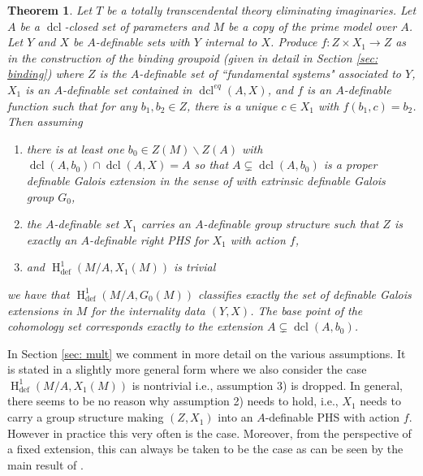 \documentclass{amsart}
\newtheorem{theorem}{Theorem}[section]
\theoremstyle{definition}
\theoremstyle{remark}
\numberwithin{equation}{section}
\def \defin {\operatorname{def}}
\def \HH {\operatorname{H}}
\def \dcl {\operatorname{dcl}}
\begin{document}
\begin{theorem} Let $T$ be a totally transcendental theory eliminating imaginaries. Let $A$ be a $\dcl$-closed set of parameters and $M$ be a copy of the prime model over $A$. Let $Y$ and $X$ be $A$-definable sets with $Y$ internal to $X$. Produce $f:Z\times X_1 \to Z$ as in the construction of the binding groupoid (given in detail in Section \ref{sec: binding}) where $Z$ is the $A$-definable set of ``fundamental systems" associated to $Y$, $X_1$ is an $A$-definable set contained in $\dcl^{eq}(A,X)$, and $f$ is an $A$-definable function such that for any $b_1,b_2 \in Z$, there is a unique $c \in X_1$ with $f(b_1,c) = b_2$. Then assuming

\begin{enumerate}
    \item there is at least one $b_0 \in Z(M)\backslash Z(A)$ with $\dcl(A,b_0) \cap \dcl(A,X) = A$ so that $A \subsetneq \dcl(A,b_0)$ is a proper definable Galois extension in the sense of \cite{OmarAnand} with extrinsic definable Galois group $G_0$,
    \item the $A$-definable set $X_1$ carries an $A$-definable group structure such that $Z$ is exactly an $A$-definable right PHS for $X_1$ with action $f$,
    \item and $\HH^1_{\defin}(M/A,X_1(M))$ is trivial
\end{enumerate}

we have that $\HH^1_{\defin}(M/A,G_0(M))$ classifies exactly the set of definable Galois extensions in $M$ for the internality data $(Y,X)$. The base point of the cohomology set corresponds exactly to the extension $A \subsetneq \dcl(A,b_0)$. 

\end{theorem}

In Section \ref{sec: mult} we comment in more detail on the various assumptions. It is stated in a slightly more general form where we also consider the case $\HH^1_{\defin}(M/A,X_1(M))$ is nontrivial i.e., assumption 3) is dropped. In general, there seems to be no reason why assumption 2) needs to hold, i.e., $X_1$ needs to carry a group structure making $(Z,X_1)$ into an $A$-definable PHS with action $f$. However in practice this very often is the case. Moreover, from the perspective of a fixed extension, this can always be taken to be the case as can be seen by the main result of \cite{OmarDavid2026}. 

\end{document}
